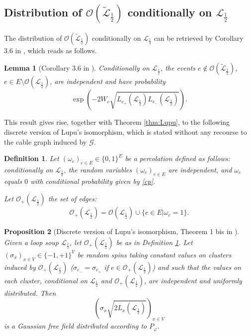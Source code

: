 \documentclass[11pt,a4paper]{amsart}
\numberwithin{equation}{section}
\newtheorem{proposition}{Proposition}[section]
\newtheorem{lemma}[proposition]{Lemma}
\newtheorem{definition}{Definition}[section]
\begin{document}
\subsection{Distribution of $\mathcal{O}(\tilde{\mathcal{L}}_{\frac{1}{2}})$  conditionally on $\mathcal{L}_{\frac{1}{2}}$ }
\label{randomcurrent}
The distribution of $\mathcal{O}(\tilde{\mathcal{L}}_{\frac{1}{2}})$  conditionally on $\mathcal{L}_{\frac{1}{2}}$ can be retrieved by  Corollary 3.6 in \cite{Lupu2014LoopsGFF}, which reads as follows. 
\begin{lemma}[Corollary 3.6 in \cite{Lupu2014LoopsGFF}]
\label{36} Conditionally on $\mathcal{L}_{\frac{1}{2}}$, the events $e\not\in\mathcal{O}(\tilde{\mathcal{L}}_{\frac{1}{2}})$, $e\in E\setminus\mathcal{O}(\mathcal{L}_{\frac{1}{2}})$, are independent and have probability
\begin{equation}
\label{cp}
\exp\left(-2 W_{e} \sqrt{L_{e_{+}}(\mathcal{L}_{\frac{1}{2}})L_{e_{-}}(\mathcal{L}_{\frac{1}{2}})}\right).
\end{equation}
\end{lemma}
This result gives rise, together with Theorem \ref{thm:Lupu}, to the following discrete version of Lupu's isomorphism, which is stated without any recourse to the cable graph induced by $\mathcal{G}$. 
\begin{definition}
\label{def:out}
Let $(\omega_{e})_{e\in E}\in\lbrace 0,1\rbrace^{E}$ be a percolation defined as follows: conditionally on $\mathcal{L}_{\frac{1}{2}}$, the random variables 
$(\omega_{e})_{e\in E}$ are independent, and $\omega_{e}$ equals $0$ with conditional probability given by \eqref{cp}.

Let $\mathcal{O}_{+}(\mathcal{L}_{\frac{1}{2}})$ the set of edges:
\begin{displaymath}
\mathcal{O}_{+}(\mathcal{L}_{\frac{1}{2}})=\mathcal{O}(\mathcal{L}_{\frac{1}{2}})
\cup \lbrace e\in E\vert \omega_{e}=1\rbrace.
\end{displaymath}
\end{definition}
\begin{proposition}[Discrete version of Lupu's isomorphism, Theorem 1 bis in \cite{Lupu2014LoopsGFF}]
\label{PropIsoLupuLoops}
Given a loop soup $\mathcal{L}_{\frac{1}{2}}$, let $\mathcal{O}_{+}(\mathcal{L}_{\frac{1}{2}})$ be as in Definition \ref{def:out}.
Let $(\sigma_{x})_{x\in V}\in\lbrace -1,+1\rbrace^{V}$ be random spins taking constant values on
clusters induced by $\mathcal{O}_{+}(\mathcal{L}_{\frac{1}{2}})$ 
($\sigma_{e_{-}}=\sigma_{e_{+}}$ if $e\in \mathcal{O}_{+}(\mathcal{L}_{\frac{1}{2}})$) and such that the values on each cluster, conditional on $\mathcal{L}_{\frac{1}{2}}$ and $\mathcal{O}_{+}(\mathcal{L}_{\frac{1}{2}})$, are independent and uniformly distributed. Then
\begin{displaymath}
\left(\sigma_{x}\sqrt{2 L_{x}(\mathcal{L}_{\frac{1}{2}})}\right)_{x\in V}
\end{displaymath}
is a Gaussian free field distributed according to $P_{\varphi}$.
\end{proposition}
\end{document}
